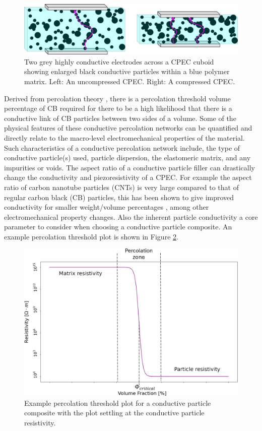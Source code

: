 \begin{figure}[H]
    \centering
    \includegraphics[width=0.7\linewidth]{Figures/res_deformed_states_x2_crop.jpg}
    \caption{Two grey highly conductive electrodes across a CPEC cuboid showing enlarged black conductive particles within a blue polymer matrix. Left: An uncompressed CPEC. Right: A compressed CPEC.}
    \label{fig:res_deformed_cube}
\end{figure}

Derived from percolation theory \cite{Spahr2017}, there is a percolation threshold volume percentage of CB required for there to be a high likelihood that there is a conductive link of CB particles between two sides of a volume. Some of the physical features of these conductive percolation networks can be quantified and directly relate to the macro-level electromechanical properties of the material. Such characteristics of a conductive percolation network include, the type of conductive particle(s) used, particle dispersion, the elastomeric matrix, and any impurities or voids. The aspect ratio of a conductive particle filler can drastically change the conductivity and piezoresistivity of a CPEC. For example the aspect ratio of carbon nanotube particles (CNTs) is very large compared to that of regular carbon black (CB) particles, this has been shown to give improved conductivity for smaller weight/volume percentages \cite{Wu2019,Flandin1999}, among other electromechanical property changes. Also the inherent particle conductivity a core parameter to consider when choosing a conductive particle composite. An example percolation threshold plot is shown in Figure \ref{fig:perc-thresh-plot}.

\begin{figure}[H]
	\centering
	\includegraphics[width=0.7\linewidth]{Figures/percolation-plot-example_labelled.png}
	\caption{Example percolation threshold plot for a conductive particle composite with the plot settling at the conductive particle resistivity.}
	\label{fig:perc-thresh-plot}
\end{figure}

